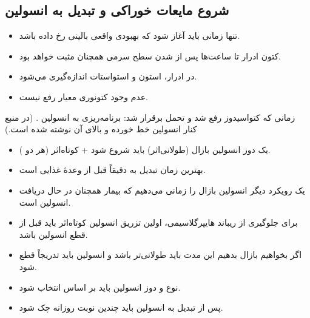 \documentclass[12pt,a4paper]{article}
\begin{document}
\subsection*{شروع مایعات خوراکی و تبدیل به انسولین }
\begin{itemize}
\item {} تنها زمانی باید آغاز شود که بهبودی واقعی بالینی رخ داده باشد.
\item کتون ادرار تا ساعت‌ها پس از  شدن سطح سرمی  همچنان مثبت خواهد بود.
\item در ادرار، استون و استواستات اندازه‌گیری می‌شود.
\item عدم وجود کتونوری معیار رفع  نیست.
\end{itemize}
زمانی که کتواسیدوز رفع شد و تحمل  برقرار شد: برنامه‌ریزی به انسولین . (در منبع  کنار انسولین خط خورده و  بالای آن نوشته شده است.)
\begin{itemize}
\item یک دوز انسولین بازال (طولانی‌اثر) باید شروع شود + کوتاه‌اثر (هر دو ).
\item بهترین زمان تبدیل به  دقیقاً قبل از وعدهٔ غذایی است.
\item یک رویکرد دیگر انسولین بازال  را زمانی می‌دهیم که بیمار همچنان در حال دریافت انسولین  است.
\end{itemize}
\begin{itemize}
\item برای جلوگیری از ریباند هایپرگلاسیمی، اولین تزریق انسولین کوتاه‌اثر  باید  قبل از قطع انسولین  باشد.
\item اگر بخواهیم بازال  بدهیم این مدت باید طولانی‌تر باشد و انسولین  باید تدریجاً قطع شود.
\item نوع و دوز انسولین  باید بر اساس  انتخاب شود.
\item پس از تبدیل به انسولین  باید چندین نوبت روزانه  چک شود.
\end{itemize}

\end{document}
